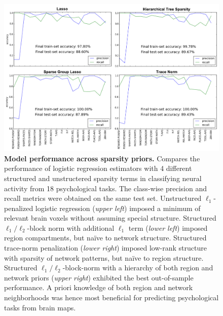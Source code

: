 \documentclass{article} %
\begin{document}
\begin{figure}
\begin{centering}
\includegraphics[width=1.00\textwidth]{figures/sparsities.pdf}
\end{centering}
\vspace{-0.6cm}
\caption{\textbf{Model performance across sparsity priors.}
Compares the performance of logistic regression estimators
with 4 different structured and unstructered sparsity terms
in classifying neural activity from 18 psychological tasks.
The class-wise precision and recall metrics
were obtained on the same test set.
%
Unstructured $\ell_1$-penalized logistic regression (\textit{upper left})
imposed a minimum of relevant brain voxels without
assuming special structure.
Structured $\ell_1/\ell_2$-block norm with additional $\ell_1$ term
(\textit{lower left})
imposed region compartments, but na\"ive to network structure.
Structured trace-norm penalization (\textit{lower right})
imposed low-rank structure
with sparsity of network patterns, but na\"ive to region structure.
Structured $\ell_1/\ell_2$-block-norm with a hierarchy of
both region and network priors (\textit{upper right})
exhibited the best out-of-sample performance.
%
A priori knowledge of both region and network neighborhoods
was hence most beneficial for predicting psychological tasks from
brain maps.
}
\label{fig_sparsities}
\end{figure}
\end{document}
